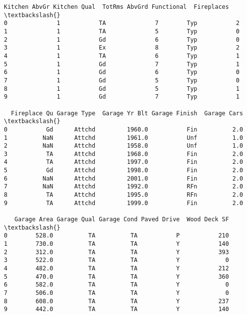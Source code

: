 \documentclass[11pt]{article}
\begin{document}
\begin{tcolorbox}[breakable, size=fbox, boxrule=.5pt, pad at break*=1mm, opacityfill=0]
\begin{Verbatim}[commandchars=\\\{\}]
   Kitchen AbvGr Kitchen Qual  TotRms AbvGrd Functional  Fireplaces  \textbackslash{}
0              1           TA              7        Typ           2
1              1           TA              5        Typ           0
2              1           Gd              6        Typ           0
3              1           Ex              8        Typ           2
4              1           TA              6        Typ           1
5              1           Gd              7        Typ           1
6              1           Gd              6        Typ           0
7              1           Gd              5        Typ           0
8              1           Gd              5        Typ           1
9              1           Gd              7        Typ           1

  Fireplace Qu Garage Type  Garage Yr Blt Garage Finish  Garage Cars  \textbackslash{}
0           Gd      Attchd         1960.0           Fin          2.0
1          NaN      Attchd         1961.0           Unf          1.0
2          NaN      Attchd         1958.0           Unf          1.0
3           TA      Attchd         1968.0           Fin          2.0
4           TA      Attchd         1997.0           Fin          2.0
5           Gd      Attchd         1998.0           Fin          2.0
6          NaN      Attchd         2001.0           Fin          2.0
7          NaN      Attchd         1992.0           RFn          2.0
8           TA      Attchd         1995.0           RFn          2.0
9           TA      Attchd         1999.0           Fin          2.0

   Garage Area Garage Qual Garage Cond Paved Drive  Wood Deck SF  \textbackslash{}
0        528.0          TA          TA           P           210
1        730.0          TA          TA           Y           140
2        312.0          TA          TA           Y           393
3        522.0          TA          TA           Y             0
4        482.0          TA          TA           Y           212
5        470.0          TA          TA           Y           360
6        582.0          TA          TA           Y             0
7        506.0          TA          TA           Y             0
8        608.0          TA          TA           Y           237
9        442.0          TA          TA           Y           140


\end{Verbatim}
\end{tcolorbox}
\end{document}
